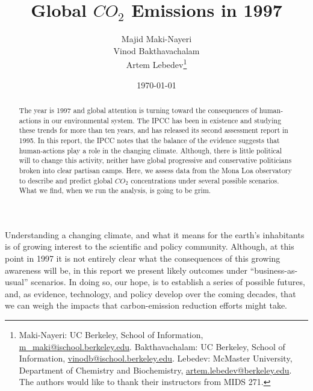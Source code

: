 \documentclass[AER]{AEA}
\begin{document}
\title{Global \(CO_{2}\) Emissions in 1997}


\author{
  Majid Maki-Nayeri\\
  Vinod Bakthavachalam\\
  Artem Lebedev\thanks{
  Maki-Nayeri: UC Berkeley, School of
Information, \href{mailto:m\_maki@ischool.berkeley.edu}{m\_maki@ischool.berkeley.edu}.
  Bakthavachalam: UC Berkeley, School of
Information, \href{mailto:vinodb@ischool.berkeley.edu}{vinodb@ischool.berkeley.edu}.
  Lebedev: McMaster University, Department of Chemistry and
Biochemistry, \href{mailto:artem.lebedev@berkeley.edu}{artem.lebedev@berkeley.edu}.
  The authors would like to thank their instructors from MIDS 271.
}
}

\date{\today}
\JEL{}

\begin{abstract}
The year is 1997 and global attention is turning toward the consequences
of human-actions in our environmental system. The IPCC has been in
existence and studying these trends for more than ten years, and has
released its second assessment report in 1995. In this report, the IPCC
notes that the balance of the evidence suggests that human-actions play
a role in the changing climate. Although, there is little political will
to change this activity, neither have global progressive and
conservative politicians broken into clear partisan camps. Here, we
assess data from the Mona Loa observatory to describe and predict global
\(CO_{2}\) concentrations under several possible scenarios. What we
find, when we run the analysis, is going to be grim.
\end{abstract}


\maketitle

Understanding a changing climate, and what it means for the earth's
inhabitants is of growing interest to the scientific and policy
community. Although, at this point in 1997 it is not entirely clear what
the consequences of this growing awareness will be, in this report we
present likely outcomes under ``business-as-usual'' scenarios. In doing
so, our hope, is to establish a series of possible futures, and, as
evidence, technology, and policy develop over the coming decades, that
we can weigh the impacts that carbon-emission reduction efforts might
take.
\end{document}
